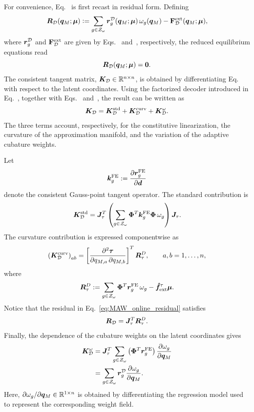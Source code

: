 \documentclass[preprint,10pt]{elsarticle}  %
\begin{document}
For convenience, Eq.~ is first recast in
residual form. Defining
\begin{equation}
\label{eq:MAW_online_residual}
\bm{R}_{\mathcal{D}}(\bm{q}_M;\bm{\mu})
\mathrel{\mathop:}=
\sum_{g\in\mathcal{Z}_{\omega}}
\bm{r}^{\mathcal{D}}_{g}(\bm{q}_M;\bm{\mu})\,
\omega_{g}(\bm{q}_M)
-
\mathbf{F}^{\mathrm{ext}}_{\mathcal{D}}(\bm{q}_M;\bm{\mu}),
\end{equation}
where \(\bm{r}^{\mathcal{D}}_{g}\) and \(\mathbf{F}^{\mathrm{ext}}_{\mathcal{D}}\) are given by
Eqs.~ and~, respectively,
the reduced equilibrium equations read
\begin{equation}
\label{eq:MAW_online_equilibrium_residual}
\bm{R}_{\mathcal{D}}(\bm{q}_M;\bm{\mu})=\bm{0}.
\end{equation}
The consistent tangent matrix,
\(\bm{K}_{\mathcal{D}}\in\mathbb{R}^{n \times n}\), is obtained by differentiating
Eq.~ with respect to the latent
coordinates. Using the factorized decoder introduced in
Eq.~, together with
Eqs.~ and~, the result can
be written as
\begin{equation}
\label{eq:manifold_tangent_split_maw}
\bm{K}_{\mathcal{D}}
=
\bm{K}_{\mathcal{D}}^{\mathrm{std}}
+
\bm{K}_{\mathcal{D}}^{\mathrm{curv}}
+
\bm{K}_{\mathcal{D}}^{\omega} .
\end{equation}
The three terms account, respectively, for the constitutive
linearization, the curvature of the approximation manifold, and the
variation of the adaptive cubature weights.

Let
\[
\bm{k}^{\mathrm{FE}}_{g}
:=
\frac{\partial\bm{r}^{\mathrm{FE}}_{g}}{\partial\bm{d}}
\]
denote the consistent Gauss-point tangent operator. The standard contribution
is
\begin{equation}
\label{eq:manifold_standard_tangent_maw}
\bm{K}_{\mathcal{D}}^{\mathrm{std}}
=
\bm{J}_{\tau}^T
\left(
\sum_{g\in\mathcal{Z}_{\omega}}
\bm{\Phi}^T
\bm{k}^{\mathrm{FE}}_{g}
\bm{\Phi}\,
\omega_{g}
\right)
\bm{J}_{\tau}.
\end{equation}
The curvature contribution is expressed componentwise as
\begin{equation}
\label{eq:manifold_curvature_tangent_maw}
\left(\bm{K}_{\mathcal{D}}^{\mathrm{curv}}\right)_{ab}
=
\left[
\frac{\partial^2\bm{\tau}}
{\partial q_{M,a}\,\partial q_{M,b}}
\right]^T
\bm R_{\tau}^{D},
\qquad
a,b=1,\ldots,n,
\end{equation}
where
\begin{equation}
\label{eq:residual_tau_maw}
\bm R_{\tau}^{D}
:=
\sum_{g\in\mathcal{Z}_{\omega}}
\bm{\Phi}^T
\bm{r}^{\mathrm{FE}}_{g}\,
\omega_{g}
-
\bm{\hat{f}}_{\mathrm{ext}}^{\tau}\bm{\mu} .
\end{equation}
Notice that the residual in Eq.~\eqref{eq:MAW_online_residual}
satisfies
\begin{equation}
\label{eq:residual_factorization_maw}
\bm{R}_{\mathcal{D}}
=
\bm{J}_{\tau}^T\bm R_{\tau}^{D}.
\end{equation}
Finally, the dependence of the cubature weights on the latent
coordinates gives
\begin{equation}
\label{eq:KweightD_def}
\begin{aligned}
\bm{K}_{\mathcal{D}}^{\omega}
&=
\bm{J}_{\tau}^T
\sum_{g\in\mathcal{Z}_{\omega}}
\left(
\bm{\Phi}^T\bm{r}^{\mathrm{FE}}_{g}
\right)
\frac{\partial\omega_{g}}{\partial\bm{q}_M}
\\
&=
\sum_{g\in\mathcal{Z}_{\omega}}
\bm{r}^{\mathcal{D}}_{g}
\frac{\partial\omega_{g}}{\partial\bm{q}_M}.
\end{aligned}
\end{equation}
Here,
\(\partial\omega_{g}/\partial\bm{q}_M\in\mathbb{R}^{1\times n}\)
is obtained by differentiating the regression model used to represent
the corresponding weight field.
\end{document}
